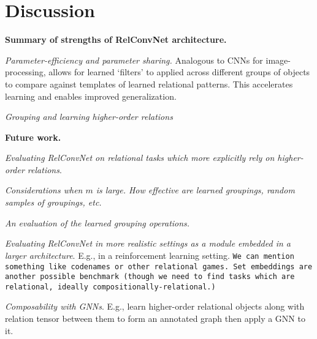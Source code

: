 
\section{Discussion}\label{sec:discussion}

\awni{[TODO]}

\textbf{Summary of strengths of RelConvNet architecture.}

\textit{Parameter-efficiency and parameter sharing.} Analogous to CNNs for image-processing, allows for learned `filters' to applied across different groups of objects to compare against templates of learned relational patterns. This accelerates learning and enables improved generalization.

\textit{Grouping and learning higher-order relations}


\textbf{Future work.} 

\textit{Evaluating RelConvNet on relational tasks which more explicitly rely on higher-order relations}.

\textit{Considerations when $m$ is large. How effective are learned groupings, random samples of groupings, etc.}

\textit{An evaluation of the learned grouping operations.}

\textit{Evaluating RelConvNet in more realistic settings as a module embedded in a larger architecture}. E.g., in a reinforcement learning setting. \texttt{We can mention something like codenames or other relational games. Set embeddings are another possible benchmark (though we need to find tasks which are relational, ideally compositionally-relational.)}

\textit{Composability with GNNs}. E.g., learn higher-order relational objects along with relation tensor between them to form an annotated graph then apply a GNN to it. 
